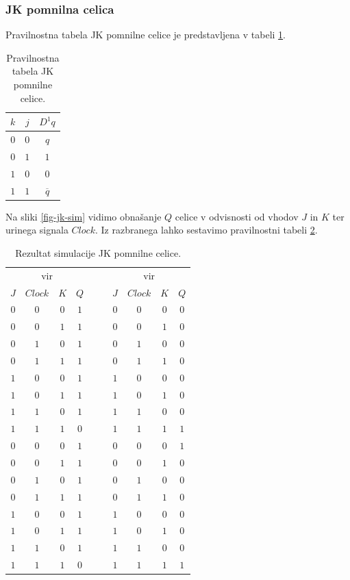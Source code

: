 \documentclass[a4paper, 11pt]{article}
\begin{document}
\subsubsection{JK pomnilna celica}
Pravilnostna tabela JK pomnilne celice je predstavljena v tabeli \ref{tab-jk}.
\begin{table}[h!]
	\centering
	\small
	\begin{tabular}{cc|c}
	$k$ & $j$ & $D^1q$ \\
	\hline
	$0$ & $0$ & $q$ \\
	$0$ & $1$ & $1$ \\
	$1$ & $0$ & $0$ \\
	$1$ & $1$ & $\overline{q}$ \\
	\end{tabular}
	\caption{Pravilnostna tabela JK pomnilne celice.}
	\label{tab-jk}
\end{table}

Na sliki \ref{fig-jk-sim} vidimo obnašanje $Q$ celice v odvisnosti od vhodov $J$ in $K$ ter urinega signala $Clock$. Iz razbranega lahko sestavimo pravilnostni tabeli \ref{tab-jk-sim}.
\begin{table}[h!]
	\centering
	\small
	\begin{tabular}{ccc|ccccc|c}
	\multicolumn{4}{c}{vir \cite{quantum_dot}} & $\quad$ & \multicolumn{4}{c}{vir \cite{a_novel_approach}}\\
	$J$ & $Clock$ & $K$ & $Q$ && $J$ & $Clock$ & $K$ & $Q$ \\
	\cline{1-4} \cline{6-9}
	$0$ & $0$ & $0$ & $1$ && $0$ & $0$ & $0$ & $0$\\
	$0$ & $0$ & $1$ & $1$ && $0$ & $0$ & $1$ & $0$\\
	$0$ & $1$ & $0$ & $1$ && $0$ & $1$ & $0$ & $0$\\
	$0$ & $1$ & $1$ & $1$ && $0$ & $1$ & $1$ & $0$\\
	$1$ & $0$ & $0$ & $1$ && $1$ & $0$ & $0$ & $0$\\
	$1$ & $0$ & $1$ & $1$ && $1$ & $0$ & $1$ & $0$\\
	$1$ & $1$ & $0$ & $1$ && $1$ & $1$ & $0$ & $0$\\
	$1$ & $1$ & $1$ & $0$ && $1$ & $1$ & $1$ & $1$\\
	\cline{1-4} \cline{6-9}
	$0$ & $0$ & $0$ & $1$ && $0$ & $0$ & $0$ & $1$\\
	$0$ & $0$ & $1$ & $1$ && $0$ & $0$ & $1$ & $0$\\
	$0$ & $1$ & $0$ & $1$ && $0$ & $1$ & $0$ & $0$\\
	$0$ & $1$ & $1$ & $1$ && $0$ & $1$ & $1$ & $0$\\
	$1$ & $0$ & $0$ & $1$ && $1$ & $0$ & $0$ & $0$\\
	$1$ & $0$ & $1$ & $1$ && $1$ & $0$ & $1$ & $0$\\
	$1$ & $1$ & $0$ & $1$ && $1$ & $1$ & $0$ & $0$\\
	$1$ & $1$ & $1$ & $0$ && $1$ & $1$ & $1$ & $1$\\
	\end{tabular}
	\caption{Rezultat simulacije JK pomnilne celice.}
	\label{tab-jk-sim}
\end{table}
\end{document}
